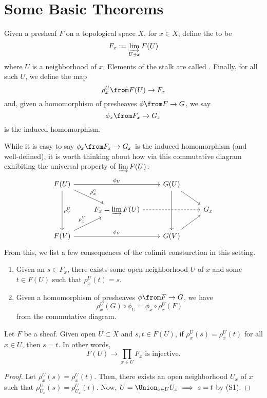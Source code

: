 \documentclass[11pt,leqno,oneside]{amsbook}
\renewcommand{\F}{F} %
\newcommand{\G}{G}
\numberwithin{thm}{section}
\begin{document}
\section{Some Basic Theorems}
\begin{defn}
  Given a presheaf \(\F\) on a topological space \(X\), for \(x \in
  X\), define the  to be \[
    \F_x := \varinjlim_{U \ni x} \F(U)
  \]
  where \(U\) is a neighborhood of \(x\). Elements of the stalk are
  called . Finally, for all such \(U\), we define the map \[
    \rho_x^U \from \F(U) \to \F_x
  \]
  and, given a homomorphism of presheaves \(\phi \from \F \to \G\), we
  say \[
    \phi_x \from \F_x \to \G_x
  \]
  is the induced homomorphism.
\end{defn}
While it is easy to say \(\phi_x \from \F_x \to \G_x\) is the induced
homomorphism (and well-defined), it is worth thinking about how via
this commutative diagram exhibiting the universal property of \(\varinjlim
\F(U)\): \[
    \begin{tikzcd}
      \F(U) \ar[dd, "\rho^U_V"] \ar[rd, "\rho^U_x"] \ar[rr, "\phi_U"] & & \G(U)
      \ar[rd] \ar[dd]\\
      & \F_x = \varinjlim \F(U) \ar[rr, dashed]& & \G_x\\
      \F(V) \ar[ru, "\rho^V_x"] \ar[rr, "\phi_V"] & & \G(V) \ar[ru]
    \end{tikzcd}
  \]
From this, we list a few consequences of the colimit consturction in
this setting.
\begin{prop}
  \begin{enumerate}
  \item Given an \(s \in \F_x\), there exists some open neighborhood
    \(U\) of \(x\) and some \(t \in \F(U)\) such that \(\rho^U_x(t) = s\).
  \item Given a homomorphism of presheaves \(\phi \from \F \to \G\),
    we have \[
      \rho^U_x(\G) \circ \phi_U = \phi_x \circ \rho^U_x(\F)
    \]
    from the commutative diagram.
  \end{enumerate}
\end{prop}
\begin{lem}
  Let \(\F\) be a sheaf. Given open \(U \subset X\) and \(s,t \in
  \F(U)\), if \(\rho_x^U(s) = \rho_x^U(t)\) for all \(x \in U\), then
  \(s=t\). In other words, \[
    \F(U) \to \prod_{x \in U} F_x \text{ is injective.}
  \]
\end{lem}
\begin{proof}
  Let \(\rho_x^U(s) = \rho_x^U(t)\). Then, there exists an open neighborhood
  \(U_x\) of \(x\) such that \(\rho_{U_x}^U(s) =
  \rho_{U_x}^U(t)\). Now, \(U = \Union_{x \in U} U_x \implies s=t\) by
  (S1). 
\end{proof}
\end{document}
